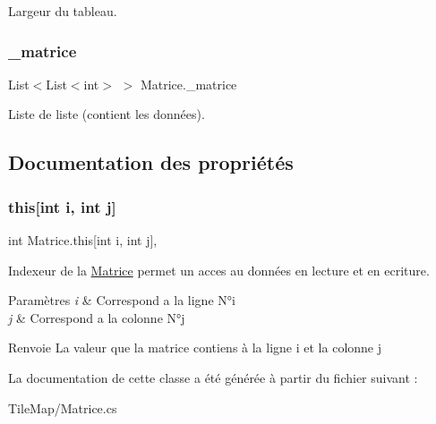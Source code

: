 Largeur du tableau.

\mbox{\label{class_matrice_af98e31a75e7e943e7fa7e59acd779a8b}} 
\subsubsection{\texorpdfstring{\+\_\+matrice}{\_matrice}}
{\footnotesize\ttfamily List$<$List$<$int$>$ $>$ Matrice.\+\_\+matrice\hspace{0.3cm}{\ttfamily [protected]}}



Liste de liste (contient les données).



\subsection{Documentation des propriétés}
\mbox{\label{class_matrice_a264f2ef7eaf36019b8c84f5bca240efc}} 
\subsubsection{\texorpdfstring{this[int i, int j]}{this[int i, int j]}}
{\footnotesize\ttfamily int Matrice.\+this\mbox{[}int i, int j\mbox{]}\hspace{0.3cm}{\ttfamily [get]}, {\ttfamily [set]}}



Indexeur de la \hyperlink{class_matrice}{Matrice} permet un acces au données en lecture et en ecriture. 


\begin{DoxyParams}{Paramètres}
{\em i} & Correspond a la ligne N°i \\
\hline
{\em j} & Correspond a la colonne N°j \\
\hline
\end{DoxyParams}
\begin{DoxyReturn}{Renvoie}
La valeur que la matrice contiens à la ligne i et la colonne j 
\end{DoxyReturn}


La documentation de cette classe a été générée à partir du fichier suivant \+:\begin{DoxyCompactItemize}
\item 
Tile\+Map/Matrice.\+cs\end{DoxyCompactItemize}
